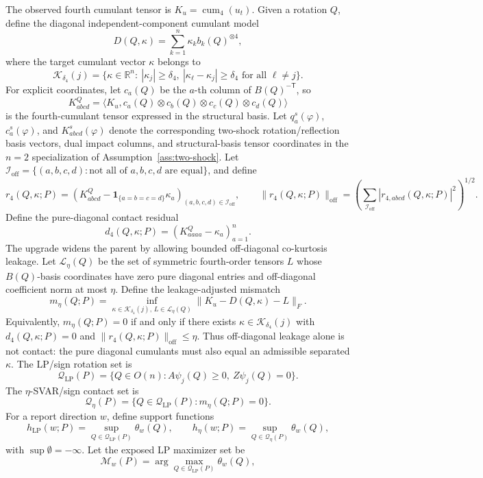 \documentclass[11pt]{article}
\newcommand{\one}{\mathbf{1}}
\newcommand{\transpose}{\mathsf{T}}
\newcommand{\R}{\mathbb{R}}
\theoremstyle{definition}
\theoremstyle{plain}
\theoremstyle{remark}
\begin{document}
The observed fourth cumulant tensor is \(K_u=\operatorname{cum}_4(u_t)\).  Given a rotation \(Q\), define the diagonal independent-component cumulant model
\[
D(Q,\kappa)=\sum_{k=1}^n\kappa_k b_k(Q)^{\otimes4},
\]
where the target cumulant vector \(\kappa\) belongs to
\[
\mathcal K_{\delta_4}(j)=
\{\kappa\in\R^n:\ |\kappa_j|\ge\delta_4,\ 
|\kappa_\ell-\kappa_j|\ge\delta_4\text{ for all }\ell\ne j\}.
\]
For explicit coordinates, let \(c_a(Q)\) be the \(a\)-th column of \(B(Q)^{-\transpose}\), so
\[
K^Q_{abcd}=\langle K_u,c_a(Q)\otimes c_b(Q)\otimes c_c(Q)\otimes c_d(Q)\rangle
\]
is the fourth-cumulant tensor expressed in the structural basis.  Let
\(q_a^s(\varphi)\), \(c_a^s(\varphi)\), and \(K^s_{abcd}(\varphi)\) denote the corresponding two-shock rotation/reflection basis vectors, dual impact columns, and structural-basis tensor coordinates in the \(n=2\) specialization of Assumption~\ref{ass:two-shock}.
Let
\(\mathcal I_{\mathrm{off}}=\{(a,b,c,d):\text{not all of }a,b,c,d\text{ are equal}\}\), and define
\[
r_4(Q,\kappa;P)=\left(K^Q_{abcd}-\one_{\{a=b=c=d\}}\kappa_a\right)_{(a,b,c,d)\in\mathcal I_{\mathrm{off}}},
\qquad
\|r_4(Q,\kappa;P)\|_{\mathrm{off}}=
\left(\sum_{\mathcal I_{\mathrm{off}}}|r_{4,abcd}(Q,\kappa;P)|^2\right)^{1/2}.
\]
Define the pure-diagonal contact residual
\[
d_4(Q,\kappa;P)=\left(K^Q_{aaaa}-\kappa_a\right)_{a=1}^n.
\]
The upgrade widens the parent by allowing bounded off-diagonal co-kurtosis leakage.  Let \(\mathcal L_\eta(Q)\) be the set of symmetric fourth-order tensors \(L\) whose \(B(Q)\)-basis coordinates have zero pure diagonal entries and off-diagonal coefficient norm at most \(\eta\).  Define the leakage-adjusted mismatch
\[
m_\eta(Q;P)=
\inf_{\kappa\in\mathcal K_{\delta_4}(j),\,L\in\mathcal L_\eta(Q)}
\|K_u-D(Q,\kappa)-L\|_F.
\]
Equivalently, \(m_\eta(Q;P)=0\) if and only if there exists
\(\kappa\in\mathcal K_{\delta_4}(j)\) with \(d_4(Q,\kappa;P)=0\) and
\(\|r_4(Q,\kappa;P)\|_{\mathrm{off}}\le\eta\).  Thus off-diagonal leakage
alone is not contact: the pure diagonal cumulants must also equal an
admissible separated \(\kappa\).
The LP/sign rotation set is
\[
\mathcal Q_{\mathrm{LP}}(P)=
\{Q\in O(n):A\psi_j(Q)\ge0,\ Z\psi_j(Q)=0\}.
\]
The \(\eta\)-SVAR/sign contact set is
\[
\mathcal Q_{\eta}(P)=
\{Q\in\mathcal Q_{\mathrm{LP}}(P):m_\eta(Q;P)=0\}.
\]
For a report direction \(w\), define support functions
\[
h_{\mathrm{LP}}(w;P)=\sup_{Q\in\mathcal Q_{\mathrm{LP}}(P)}\theta_w(Q),
\qquad
h_\eta(w;P)=\sup_{Q\in\mathcal Q_\eta(P)}\theta_w(Q),
\]
with \(\sup\emptyset=-\infty\).  Let the exposed LP maximizer set be
\[
\mathcal M_w(P)=\arg\max_{Q\in\mathcal Q_{\mathrm{LP}}(P)}\theta_w(Q),
\]
\end{document}
